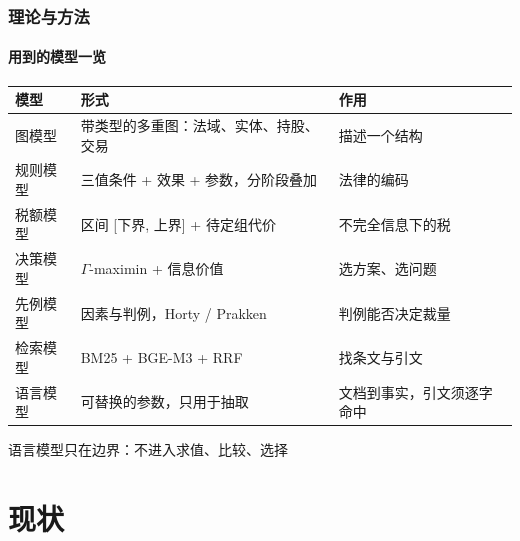 \documentclass[english, sectionpage=false]{tumbeamer}
\renewcommand{\arraystretch}{1.05}
\newcommand{\subnote}[1]{{\footnotesize\color{TUMGrayDark} #1}}
\begin{document}
\begin{frame}
  \frametitle{理论与方法}
  \framesubtitle{用到的模型一览}
  \centering
  \small
  \renewcommand{\arraystretch}{1.2}
  \begin{tabular}{@{}lll@{}}
    \toprule
    \textbf{模型} & \textbf{形式} & \textbf{作用}\\
    \midrule
    图模型 & 带类型的多重图：法域、实体、持股、交易 & 描述一个结构\\
    规则模型 & 三值条件 + 效果 + 参数，分阶段叠加 & 法律的编码\\
    税额模型 & 区间 [下界, 上界] + 待定组代价 & 不完全信息下的税\\
    决策模型 & $\Gamma$-maximin + 信息价值 & 选方案、选问题\\
    先例模型 & 因素与判例，Horty / Prakken & 判例能否决定裁量\\
    检索模型 & BM25 + BGE-M3 + RRF & 找条文与引文\\
    语言模型 & 可替换的参数，只用于抽取 & 文档到事实，引文须逐字命中\\
    \bottomrule
  \end{tabular}
  \par\vspace{0.4em}
  \subnote{语言模型只在边界：不进入求值、比较、选择}
\end{frame}

\section{现状}
\end{document}

